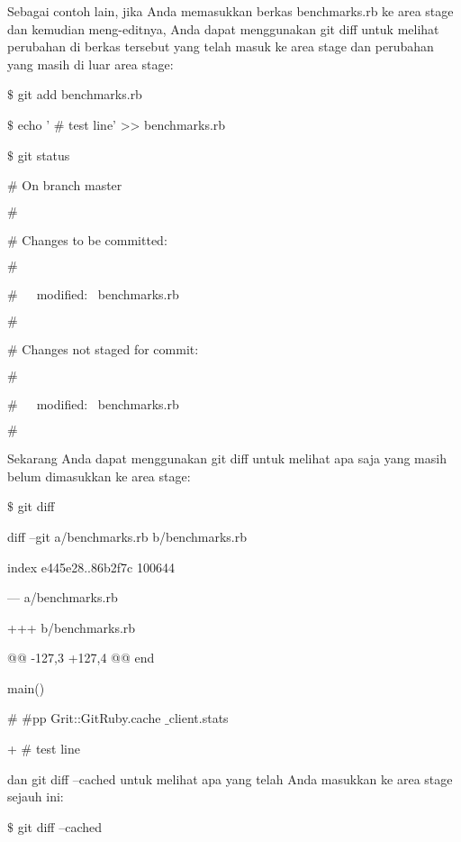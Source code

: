\noindent 
Sebagai contoh lain, jika Anda memasukkan berkas benchmarks.rb ke area stage dan kemudian meng-editnya, Anda dapat menggunakan $  $git diff $  $untuk melihat perubahan di berkas tersebut yang telah masuk ke area stage dan perubahan yang masih di luar area stage: \par
\noindent 
 $  \$  $ git add benchmarks.rb \par
\noindent 
 $  \$  $ echo ' $  \#  $ test line' >> benchmarks.rb \par
\noindent 
 $  \$  $ git status \par
\noindent 
 $  \#  $ On branch master \par
\noindent 
 $  \#  $ \par
\noindent 
 $  \#  $ Changes to be committed: \par
\noindent 
 $  \#  $ \par
\noindent 
 $  \#  $~~~modified:~  benchmarks.rb \par
\noindent 
 $  \#  $ \par
\noindent 
 $  \#  $ Changes not staged for commit: \par
\noindent 
 $  \#  $ \par
\noindent 
 $  \#  $~~~modified:~  benchmarks.rb \par
\noindent 
 $  \#  $ \par
\noindent 
Sekarang Anda dapat menggunakan $  $git diff $  $untuk melihat apa saja yang masih belum dimasukkan ke area stage: \par
\noindent 
 $  \$  $ git diff \par
\noindent 
diff --git a/benchmarks.rb b/benchmarks.rb \par
\noindent 
index e445e28..86b2f7c 100644 \par
\noindent 
--- a/benchmarks.rb \par
\noindent 
+++ b/benchmarks.rb \par
\noindent 
@@ -127,3 +127,4 @@ end \par
\noindent 
main() \par
\vspace{12pt}
\noindent 
 $  \#  $ $  \#  $pp Grit::GitRuby.cache $  \_  $client.stats \par
\noindent 
+ $  \#  $ test line \par
\noindent 
dan $  $git diff --cached $  $untuk melihat apa yang telah Anda masukkan ke area stage sejauh ini: \par
\noindent 
 $  \$  $ git diff --cached \par
\noindent 
